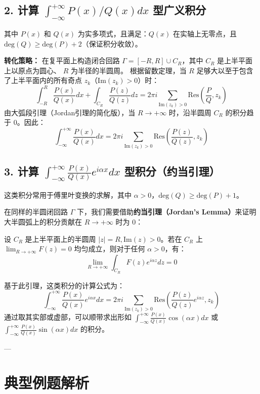 \subsection{2. 计算 $\int_{-\infty}^{+\infty} P(x)/Q(x) dx$ 型广义积分}
其中 $P(x)$ 和 $Q(x)$ 为实多项式，且满足：$Q(x)$ 在实轴上无零点，且 $\text{deg}(Q) \ge \text{deg}(P) + 2$（保证积分收敛）。

\textbf{转化策略：}
在复平面上构造闭合回路 $\Gamma = [-R, R] \cup C_R$，其中 $C_R$ 是上半平面上以原点为圆心、 $R$ 为半径的半圆周。
根据留数定理，当 $R$ 足够大以至于包含了上半平面内的所有奇点 $z_k$（$\text{Im}(z_k) > 0$）时：
$$ \int_{-R}^{R} \frac{P(x)}{Q(x)} dx + \int_{C_R} \frac{P(z)}{Q(z)} dz = 2\pi i \sum_{\text{Im}(z_k)>0} \text{Res}\left( \frac{P}{Q}, z_k \right) $$
由大弧段引理（Jordan引理的简化版），当 $R \to +\infty$ 时，沿半圆周 $C_R$ 的积分趋于 0。因此：
$$ \int_{-\infty}^{+\infty} \frac{P(x)}{Q(x)} dx = 2\pi i \sum_{\text{Im}(z_k)>0} \text{Res}\left( \frac{P(z)}{Q(z)}, z_k \right) $$

\subsection{3. 计算 $\int_{-\infty}^{+\infty} \frac{P(x)}{Q(x)} e^{i\alpha x} dx$ 型积分（约当引理）}
这类积分常用于傅里叶变换的求解，其中 $\alpha > 0$，$\text{deg}(Q) \ge \text{deg}(P) + 1$。

在同样的半圆闭回路 $\Gamma$ 下，我们需要借助\textbf{约当引理（Jordan's Lemma）}来证明大半圆弧上的积分贡献在 $R \to +\infty$ 时为 0：
\begin{lemma}[约当引理]
	设 $C_R$ 是上半平面上的半圆周 $|z|=R, \text{Im}(z) > 0$。若在 $C_R$ 上 $\lim_{R \to +\infty} F(z) = 0$ 均匀成立，则对于任何 $\alpha > 0$，有：
	$$ \lim_{R \to +\infty} \int_{C_R} F(z) e^{i\alpha z} dz = 0 $$
\end{lemma}

基于此引理，这类积分的计算公式为：
$$ \int_{-\infty}^{+\infty} \frac{P(x)}{Q(x)} e^{i\alpha x} dx = 2\pi i \sum_{\text{Im}(z_k)>0} \text{Res}\left( \frac{P(z)}{Q(z)} e^{i\alpha z}, z_k \right) $$
通过取其实部或虚部，可以顺带求出形如 $\int_{-\infty}^{+\infty} \frac{P(x)}{Q(x)}\cos(\alpha x) dx$ 或 $\int_{-\infty}^{+\infty} \frac{P(x)}{Q(x)}\sin(\alpha x) dx$ 的积分。

---

\section{典型例题解析}

